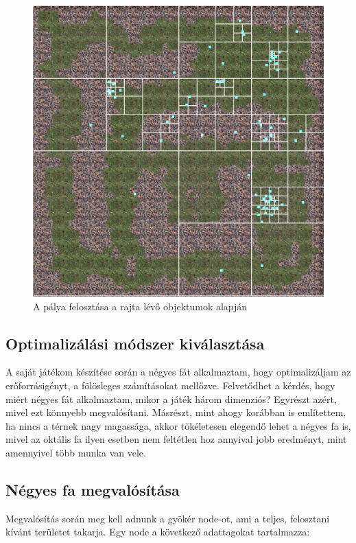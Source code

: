 \begin{figure}[h]
\centering
\includegraphics[scale=0.22]{kepek/quadtree.png}
\caption{A pálya felosztása a rajta lévő objektumok alapján}
\label{fig:quadtree}
\end{figure}

\subsection{Optimalizálási módszer kiválasztása}

A saját játékom készítése során a négyes fát alkalmaztam, hogy optimalizáljam az erőforrásigényt, a fölösleges számításokat mellőzve. Felvetődhet a kérdés, hogy miért négyes fát alkalmaztam, mikor a játék három dimenziós? Egyrészt azért, mivel ezt könnyebb megvalósítani. Másrészt, mint ahogy korábban is említettem, ha nincs a térnek nagy magassága, akkor tökéletesen elegendő lehet a négyes fa is, mivel az oktális fa ilyen esetben nem feltétlen hoz annyival jobb eredményt, mint amennyivel több munka van vele.

\subsection{Négyes fa megvalósítása}

Megvalósítás során meg kell adnunk a gyökér node-ot, ami a teljes, felosztani kívánt területet takarja. Egy node a következő adattagokat tartalmazza:

